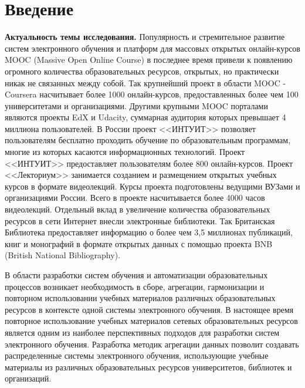 \chapter*{Введение}							%

\textbf{Актуальность темы исследования.}
Популярность и стремительное развитие систем электронного обучения и платформ для массовых открытых онлайн-курсов MOOC (Massive Open Online Course) в последнее время привели к появлению огромного количества образовательных ресурсов, открытых, но практически никак не связанных между собой. Так крупнейший проект в области MOOC - Coursera насчитывает более 1000 онлайн-курсов, предоставленных более чем 100 университетами и организациями. Другими крупными MOOC порталами являются проекты EdX и Udacity, суммарная аудитория которых превышает 4 миллиона пользователей. В России проект <<ИНТУИТ>> позволяет пользователям бесплатно проходить обучение по образовательным программам, многие из которых касаются информационных технологий. Проект <<ИНТУИТ>> предоставляет пользователям более 800 онлайн-курсов. Проект <<Лекториум>> занимается созданием и размещением открытых учебных курсов в формате видеолекций. Курсы проекта подготовлены ведущими ВУЗами и организациями России. Всего в проекте насчитывается более 4000 часов видеолекций. Отдельный вклад в увеличение количества образовательных ресурсов в сети Интернет внесли электронные библиотеки. Так Британская Библиотека предоставляет информацию о более чем 3,5 миллионах публикаций, книг и монографий в формате открытых данных с помощью проекта BNB (British National Bibliography). 

В области разработки систем обучения и автоматизации образовательных процессов возникает необходимость в сборе, агрегации, гармонизации и повторном использовании учебных материалов различных образовательных ресурсов в контексте одной системы электронного обучения. В настоящее время повторное использование учебных материалов сетевых образовательных ресурсов является одним из наиболее перспективных подходов для разработки систем электронного обучения. Разработка методик агрегации данных позволит создавать распределенные системы электронного обучения, использующие учебные материалы из различных образовательных ресурсов университетов, библиотек и организаций.

